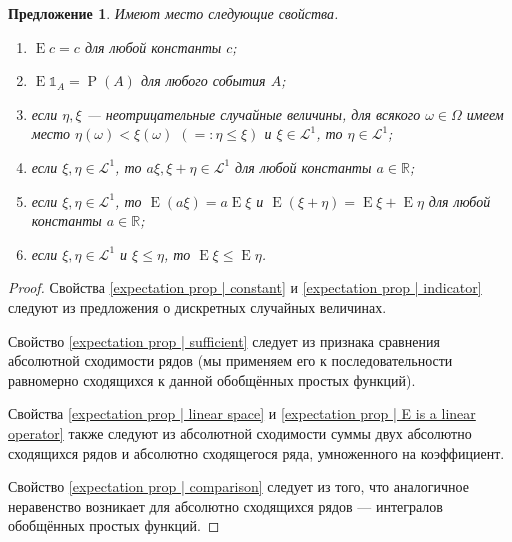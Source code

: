 \documentclass[12pt]{article}
\newtheorem{proposition}[theorem]{Предложение}
\numberwithin{theorem}{section}
\theoremstyle{definition}
\newcommand{\RR}{\mathbb{R}}
\newcommand{\prob}{\operatorname{P}}
\newcommand{\expect}{\operatorname{E}}
\newcommand{\ind}{\mathds{1}}
\begin{document}
	\begin{proposition} \label{expectation prop}
		Имеют место следующие свойства.
		\begin{enumerate}
			\item $ \expect c = c $ для любой константы $ c $;
			\label{expectation prop | constant}
			\item $ \expect \ind_A = \prob(A) $ для любого события $ A $;
			\label{expectation prop | indicator}
			\item если $ \eta, \xi $ --- неотрицательные случайные величины,
			для всякого $ \omega \in \Omega $ имеем место $ \eta(\omega) < \xi(\omega) $ $(=: \eta \leqslant \xi )$
			и $ \xi \in \mathcal{L}^1 $, то $ \eta \in \mathcal{L}^1 $;
			\label{expectation prop | sufficient}
			\item если $ \xi, \eta \in \mathcal{L}^1 $,
			то $ a\xi, \xi + \eta \in \mathcal{L}^1 $ для любой константы $ a \in \RR $;
			\label{expectation prop | linear space}
			\item если $ \xi, \eta \in \mathcal{L}^1 $, то $ \expect (a\xi) = a\expect\xi $
			и $ \expect(\xi + \eta) = \expect\xi + \expect\eta $ для любой константы $ a \in \RR $;
			\label{expectation prop | E is a linear operator}
			\item если $ \xi, \eta \in \mathcal{L}^1 $ и $ \xi \leqslant \eta $, то $ \expect\xi \leqslant \expect\eta $.
			\label{expectation prop | comparison}
		\end{enumerate}
	\end{proposition}
	
	\begin{proof}
		Свойства \ref{expectation prop | constant} и \ref{expectation prop | indicator} 
		следуют из предложения о дискретных случайных величинах.
		
		Свойство \ref{expectation prop | sufficient} следует из признака сравнения абсолютной сходимости рядов 
		(мы применяем его к последовательности равномерно сходящихся к данной обобщённых простых функций).
		
		Свойства \ref{expectation prop | linear space} и \ref{expectation prop | E is a linear operator}
		также следуют из абсолютной сходимости суммы двух абсолютно сходящихся рядов
		и абсолютно сходящегося ряда, умноженного на коэффициент.
		
		Свойство \ref{expectation prop | comparison} следует из того, что аналогичное неравенство возникает для
		абсолютно сходящихся рядов --- интегралов обобщённых простых функций.
	\end{proof}
	
\end{document}
